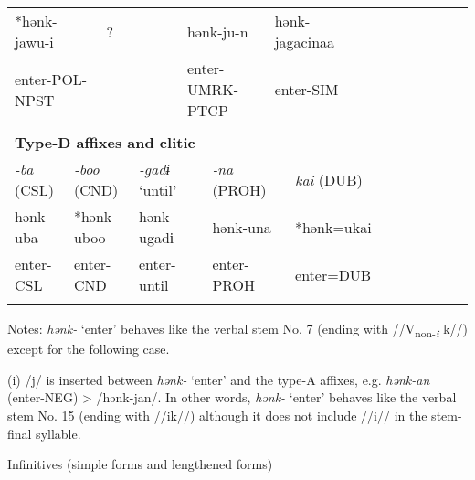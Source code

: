 \begin{tabularx}{\textwidth}{XXXXXXXXXXXXXXXXXXXXXX}
\multicolumn{3}{X}{{ *hənk-jawu-i}} & \multicolumn{4}{X}{?} & \multicolumn{4}{X}{{ hənk-ju-n}} & \multicolumn{4}{X}{{ hənk-jagacinaa}} & \multicolumn{7}{X}{}\\
\multicolumn{3}{X}{enter-POL-NPST} & \multicolumn{4}{X}{} & \multicolumn{4}{X}{enter-UMRK-PTCP} & \multicolumn{4}{X}{enter-SIM} & \multicolumn{7}{X}{}\\
\multicolumn{22}{X}{}\\
\multicolumn{22}{X}{{\bfseries Type-D affixes and clitic}}\\
\multicolumn{2}{X}{{ \textit{{}-ba} (CSL)}} & \multicolumn{2}{X}{{ \textit{{}-boo} (CND)}} & \multicolumn{4}{X}{{ \textit{{}-gadɨ} ‘until’}} & \multicolumn{4}{X}{{ \textit{{}-na} (PROH)}} & \multicolumn{4}{X}{{ \textit{kai} (DUB)}} & \multicolumn{6}{X}{}\\
\multicolumn{2}{X}{{ hənk-uba}} & \multicolumn{2}{X}{{ *hənk-uboo}} & \multicolumn{4}{X}{{ hənk-ugadɨ}} & \multicolumn{4}{X}{{ hənk-una}} & \multicolumn{4}{X}{{ *hənk=ukai}} & \multicolumn{6}{X}{}\\
\multicolumn{2}{X}{enter-CSL} & \multicolumn{2}{X}{enter-CND} & \multicolumn{4}{X}{enter-until} & \multicolumn{4}{X}{enter-PROH} & \multicolumn{4}{X}{enter=DUB} & \multicolumn{6}{X}{}\\
\lspbottomrule
\end{tabularx}
Notes: \textit{hənk-} ‘enter’ behaves like the verbal stem No. 7 (ending with //V\textsubscript{non-}\textit{\textsubscript{i}} k//) except for the following case.

(i)  /j/ is inserted between \textit{hənk-} ‘enter’ and the type-A affixes, e.g. \textit{hənk-an} (enter-NEG) > /hənk-jan/. In other words, \textit{hənk-} ‘enter’ behaves like the verbal stem No. 15 (ending with //ik//) although it does not include //i// in the stem-final syllable.

Infinitives (simple forms and lengthened forms)

\tablefirsthead{}

